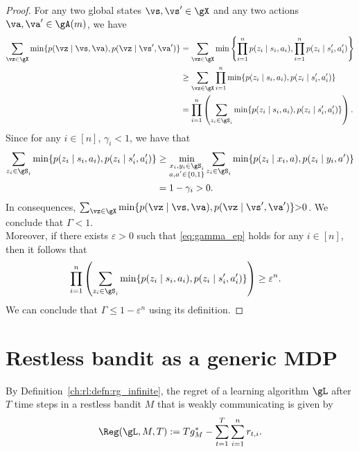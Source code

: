\begin{proof}
    For any two global states $\vs,\vs'\in\gX$ and any two actions $\va,\va'\in\gA(m)$, we have
    \begin{align*}
        \sum_{\vz\in\gX} \min\{p(\vz \mid \vs, \va), p(\vz \mid \vs', \va')\}
        &= \sum_{\vz\in\gX} \min\left\{\prod_{i=1}^np(z_i \mid s_i, a_i), \prod_{i=1}^np(z_i \mid s'_i, a'_i)\right\} \\
        &\ge \sum_{\vz\in\gX}\prod_{i=1}^n \min\{p(z_i \mid s_i, a_i), p(z_i \mid s'_i, a'_i)\} \\
        &= \prod_{i=1}^n \left(\sum_{z_i\in\gS_i} \min\{p(z_i \mid s_i, a_i), p(z_i \mid s'_i, a'_i)\}\right).
    \end{align*}
    Since for any $i\in[n]$, $\gamma_i<1$, we have that
    \begin{align*}
        \sum_{z_i\in\gS_i} \min\{p(z_i \mid s_i, a_i), p(z_i \mid s'_i, a'_i)\}
        &\ge \min_{\substack{x_i,y_i\in\gS_i \\a,a'\in\{0,1\}}} \sum_{z_i\in\gS_i} \min\{p(z_i \mid x_i, a), p(z_i \mid y_i, a')\} \\
        &= 1-\gamma_i >0.
    \end{align*}
    In consequences, ${\sum_{\vz\in\gX} \min\{p(\vz \mid \vs, \va), p(\vz \mid \vs', \va')\}{>}0}$.
    We conclude that $\Gamma{<}1$.\\
    Moreover, if there exists $\varepsilon>0$ such that \eqref{eq:gamma_ep} holds for any $i\in[n]$, then it follows that
    \begin{align*}
        \prod_{i=1}^n \left(\sum_{z_i\in\gS_i} \min\{p(z_i \mid s_i, a_i), p(z_i \mid s'_i, a'_i)\}\right)
        &\ge \varepsilon^n.
    \end{align*}
    We can conclude that $\Gamma\le 1-\varepsilon^n$ using its definition.
\end{proof}


\section{Restless bandit as a generic MDP}
\label{ch:restless:sec:generic}


By Definition~\ref{ch:rl:defn:rg_infinite}, the regret of a learning algorithm $\gL$ after $T$ time steps in a restless bandit $M$ that is weakly communicating is given by
\begin{align}
    \Reg(\gL,M,T) := Tg^*_M - \sum_{t=1}^{T} \sum_{i=1}^nr_{t,i}. \label{eq:regret}
\end{align}

